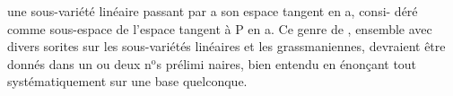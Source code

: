 
une sous-variété linéaire passant par a son espace tangent en a, consi-%
déré comme sous-espace  de l'espace tangent à P en a. Ce genre
de , ensemble avec divers sorites sur les sous-variétés linéaires
et les grassmaniennes, devraient être donnés dans un ou deux n$^{\text{o}}$s prélimi
naires, bien entendu en énonçant tout systématiquement sur une base
quelconque.

